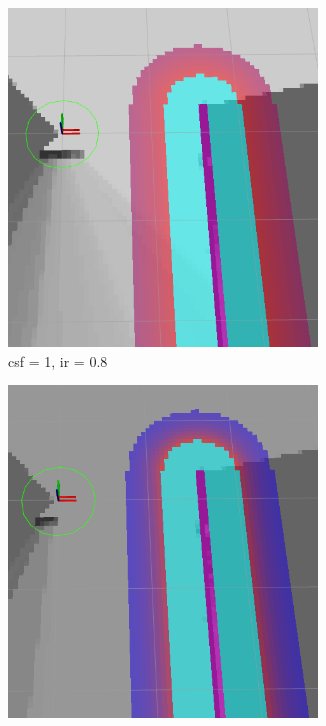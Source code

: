 \documentclass[capstone_report.tex]{subfiles}
\begin{document}
\begin{figure}[H]
    \centering
    \begin{subfigure}{0.33\textwidth}
        \centering
        \includegraphics[width=0.9\textwidth]{imgs/lcm/lcm_csf_1_ir_08.png}
        \caption{csf = 1, ir = 0.8}
    \end{subfigure}%
    \begin{subfigure}{0.33\textwidth}
        \centering
        \includegraphics[width=0.9\textwidth]{imgs/lcm/lcm_csf_553_ir_08.png}

\end{subfigure}
\end{figure}
\end{document}
